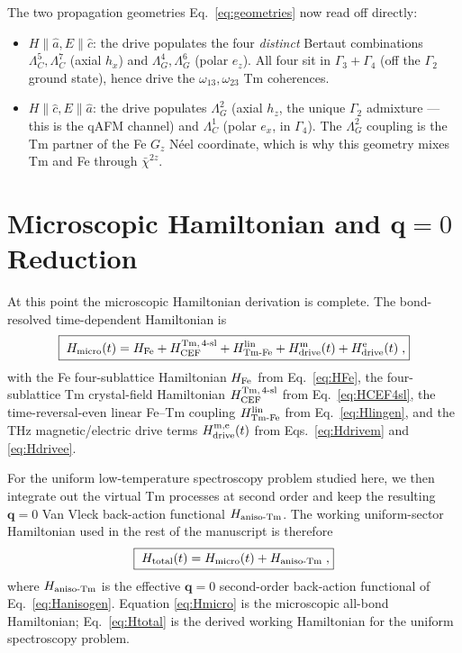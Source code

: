 \documentclass[reprint,amsmath,amssymb,aps,prb,longbibliography]{revtex4-2}
\begin{document}
The two propagation geometries Eq.~\eqref{eq:geometries} now read off
directly:
\begin{itemize}[leftmargin=*]
\item $H\!\parallel\!\hat a, E\!\parallel\!\hat c$:
the drive populates the four \emph{distinct} Bertaut combinations
$\Lambda^5_C, \Lambda^7_C$ (axial $h_x$) and $\Lambda^4_G, \Lambda^6_G$
(polar $e_z$). All four sit in $\Gamma_3+\Gamma_4$ (off the $\Gamma_2$
ground state), hence drive the $\omega_{13},\omega_{23}$ Tm coherences.
\item $H\!\parallel\!\hat c, E\!\parallel\!\hat a$:
the drive populates $\Lambda^2_G$ (axial $h_z$, the unique $\Gamma_2$
admixture --- this is the qAFM channel) and $\Lambda^1_C$ (polar $e_x$,
in $\Gamma_4$). The $\Lambda^2_G$ coupling is the Tm partner of the Fe
$G_z$ N\'eel coordinate, which is why this geometry mixes Tm and Fe
through $\bar\chi^{2z}$.
\end{itemize}

\section{Microscopic Hamiltonian and \texorpdfstring{$\mathbf q=0$}{q=0} Reduction}
\label{sec:Htotal}

At this point the microscopic Hamiltonian derivation is complete. The
bond-resolved time-dependent Hamiltonian is
\begin{equation}
\boxed{\;
H_{\rm micro}(t) = H_{\rm Fe} + H_{\rm CEF}^{\rm Tm,\,4\text{-}sl}
+ H_{\rm Tm\text{-}Fe}^{\rm lin}
+ H_{\rm drive}^{\rm m}(t) + H_{\rm drive}^{\rm e}(t)\;,
}
\label{eq:Hmicro}
\end{equation}
with the Fe four-sublattice Hamiltonian $H_{\rm Fe}$ from
Eq.~\eqref{eq:HFe}, the four-sublattice Tm crystal-field Hamiltonian
$H_{\rm CEF}^{\rm Tm,\,4\text{-}sl}$ from Eq.~\eqref{eq:HCEF4sl}, the
time-reversal-even linear Fe--Tm coupling $H_{\rm Tm\text{-}Fe}^{\rm lin}$
from Eq.~\eqref{eq:Hlingen}, and the THz magnetic/electric drive terms
$H_{\rm drive}^{\rm m,e}(t)$ from Eqs.~\eqref{eq:Hdrivem}
and \eqref{eq:Hdrivee}.

For the uniform low-temperature spectroscopy problem studied here, we then
integrate out the virtual Tm processes at second order and keep the
resulting $\mathbf q=0$ Van Vleck back-action functional
$H_{\rm aniso\text{-}Tm}$. The working uniform-sector Hamiltonian used in the
rest of the manuscript is therefore
\begin{equation}
\boxed{\;
H_{\rm total}(t) = H_{\rm micro}(t) + H_{\rm aniso\text{-}Tm}\;,
}
\label{eq:Htotal}
\end{equation}
where $H_{\rm aniso\text{-}Tm}$ is the effective $\mathbf q=0$ second-order
back-action functional of Eq.~\eqref{eq:Hanisogen}. Equation
\eqref{eq:Hmicro} is the microscopic all-bond Hamiltonian; Eq.~\eqref{eq:Htotal}
is the derived working Hamiltonian for the uniform spectroscopy problem.
\end{document}
